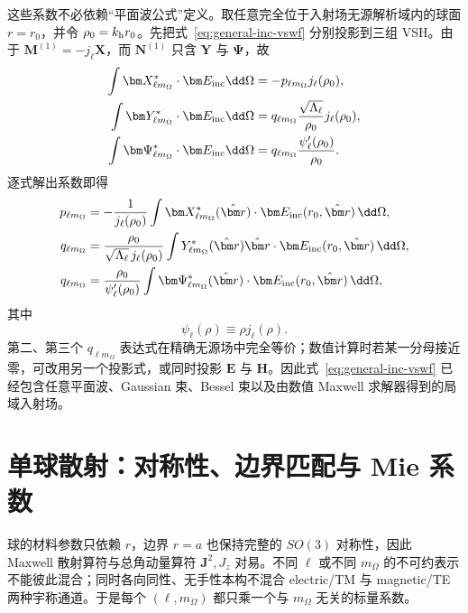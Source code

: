 这些系数不必依赖“平面波公式”定义。取任意完全位于入射场无源解析域内的球面 $r=r_0$，并令
$\rho_0=k_{\rm h}r_0$。先把式~\eqref{eq:general-inc-vswf} 分别投影到三组 VSH。由于 $\bm M^{(1)}=-j_\ell\bm X$，而 $\bm N^{(1)}$ 只含 $\bm Y$ 与 $\bm\Psi$，故
\begin{align}
\int\bm X_{\ell m_\Omega}^*\cdot\bm E_{\rm inc}\dd\Omega
&=-p_{\ell m_\Omega}j_\ell(\rho_0),\\
\int\bm Y_{\ell m_\Omega}^*\cdot\bm E_{\rm inc}\dd\Omega
&=q_{\ell m_\Omega}\frac{\sqrt{\Lambda_\ell}}{\rho_0}j_\ell(\rho_0),\\
\int\bm\Psi_{\ell m_\Omega}^*\cdot\bm E_{\rm inc}\dd\Omega
&=q_{\ell m_\Omega}\frac{\psi_\ell'(\rho_0)}{\rho_0}.
\end{align}
逐式解出系数即得
\begin{align}
p_{\ell m_{\Omega}}
&=-\frac{1}{j_\ell(\rho_0)}
\int\bm X_{\ell m_{\Omega}}^*(\hat{\bm r})
\cdot\bm E_{\rm inc}(r_0,\hat{\bm r})\,\dd\Omega,
\label{eq:beam-shape-p-projection}
\\
q_{\ell m_{\Omega}}
&=\frac{\rho_0}
{\sqrt{\Lambda_\ell}\,j_\ell(\rho_0)}
\int Y_{\ell m_{\Omega}}^*(\hat{\bm r})
\hat{\bm r}\cdot\bm E_{\rm inc}(r_0,\hat{\bm r})\,\dd\Omega,
\label{eq:beam-shape-q-radial}
\\
q_{\ell m_{\Omega}}
&=\frac{\rho_0}
{\psi_\ell'(\rho_0)}
\int\bm\Psi_{\ell m_{\Omega}}^*(\hat{\bm r})
\cdot\bm E_{\rm inc}(r_0,\hat{\bm r})\,\dd\Omega,
\label{eq:beam-shape-q-tangential}
\end{align}
其中
\begin{equation}
\psi_\ell(\rho)\equiv\rho j_\ell(\rho).
\end{equation}
第二、第三个 $q_{\ell m_{\Omega}}$ 表达式在精确无源场中完全等价；数值计算时若某一分母接近零，可改用另一个投影式，或同时投影 $\bm E$ 与 $\bm H$。因此式~\eqref{eq:general-inc-vswf} 已经包含任意平面波、Gaussian 束、Bessel 束以及由数值 Maxwell 求解器得到的局域入射场。


\section{单球散射：对称性、边界匹配与 Mie 系数}
球的材料参数只依赖 $r$，边界 $r=a$ 也保持完整的 $SO(3)$ 对称性，因此 Maxwell 散射算符与总角动量算符
$\bm J^2,J_z$ 对易。不同 $\ell$ 或不同 $m_{\Omega}$ 的不可约表示不能彼此混合；同时各向同性、无手性本构不混合 electric/TM 与 magnetic/TE 两种宇称通道。于是每个
$(\ell,m_{\Omega})$ 都只乘一个与 $m_{\Omega}$ 无关的标量系数。

